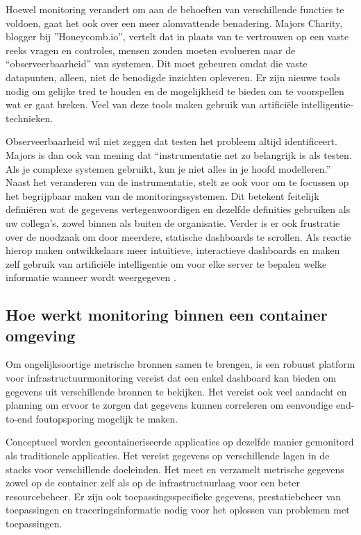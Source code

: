 Hoewel monitoring verandert om aan de behoeften van verschillende functies te voldoen, gaat het ook over een meer alomvattende benadering. Majors Charity, blogger bij ''Honeycomb.io''\autocite{Majors2016}, vertelt dat in plaats van te vertrouwen op een vaste reeks vragen en controles, mensen zouden moeten evolueren naar de “observeerbaarheid” van systemen. Dit moet gebeuren omdat die vaste datapunten, alleen, niet de benodigde inzichten opleveren. Er zijn nieuwe tools nodig om gelijke tred te houden en de mogelijkheid te bieden om te voorspellen wat er gaat breken. Veel van deze tools maken gebruik van artificiële intelligentie-technieken. 

Observeerbaarheid wil niet zeggen dat testen het probleem altijd identificeert. Majors is dan ook van mening dat “instrumentatie net zo belangrijk is als testen. Als je complexe systemen gebruikt, kun je niet alles in je hoofd modelleren.” Naast het veranderen van de instrumentatie, stelt ze ook voor om te focussen op het begrijpbaar maken van de monitoringssystemen. Dit betekent feitelijk definiëren wat de gegevens vertegenwoordigen en dezelfde definities gebruiken als uw collega's, zowel binnen als buiten de organisatie. Verder is er ook frustratie over de noodzaak om door meerdere, statische dashboards te scrollen. Als reactie hierop maken ontwikkelaars meer intuïtieve, interactieve dashboards en maken zelf gebruik van artificiële intelligentie om voor elke server te bepalen welke informatie wanneer wordt weergegeven \autocite{Williams2016}.

\subsection{Hoe werkt monitoring binnen een container omgeving}

Om ongelijksoortige metrische bronnen samen te brengen, is een robuust platform voor infrastructuurmonitoring vereist dat een enkel dashboard kan bieden om gegevens uit verschillende bronnen te bekijken. Het vereist ook veel aandacht en planning om ervoor te zorgen dat gegevens kunnen correleren om eenvoudige end-to-end foutopsporing mogelijk te maken.

Conceptueel worden gecontaineriseerde applicaties op dezelfde manier gemonitord als traditionele applicaties. Het vereist gegevens op verschillende lagen in de stacks voor verschillende doeleinden. Het meet en verzamelt metrische gegevens zowel op de container zelf als op de infrastructuurlaag voor een beter resourcebeheer. Er zijn ook toepassingsspecifieke gegevens, prestatiebeheer van toepassingen en traceringsinformatie nodig voor het oplossen van problemen met toepassingen.

